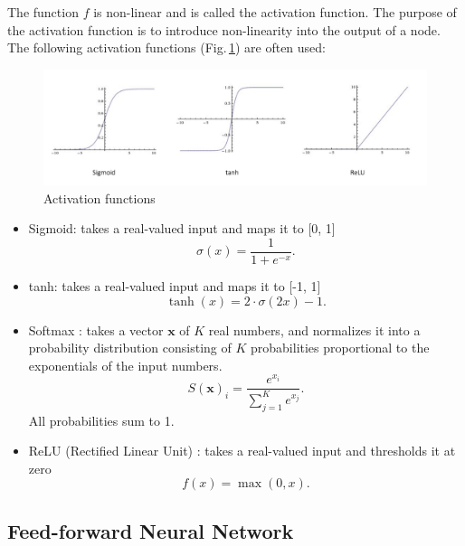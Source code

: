 The function $f$ is non-linear and is called the activation function. The purpose of the activation function is to introduce non-linearity into the output of a node. The following activation functions (Fig.\,\ref{activation}) are often used:
\begin{figure}
	\centering
	\includegraphics[scale=0.5]{Figs/activation.png}
    \caption{Activation functions}
    \label{activation}
\end{figure}

\begin{itemize}
  \item Sigmoid: takes a real-valued input and maps it to [0, 1]
        \begin{equation}
        \label{eq:sigmoid}
        \sigma(x) =  \frac{\mathrm{1} }{\mathrm{1} + e^{-x} }.
        \end{equation}
  \item tanh: takes a real-valued input and maps it to [-1, 1]
  \begin{equation}
        \label{eq:tanh}
        \tanh(x) = 2\cdot\sigma(2x)-1.
        \end{equation}
  \item Softmax \citep{Goodfellow-et-al-2016}:  takes a vector $\mathbf{x}$ of $K$ real numbers, and normalizes it into a probability distribution consisting of $K$ probabilities proportional to the exponentials of the input numbers.
        \begin{equation}
        \label{eq:softmax}
        S(\mathbf{x})_i = \frac{e^{x_i}}{\sum_{j=1}^K e^{x_j}}.
        \end{equation}
        All probabilities sum to 1. 
\item ReLU (Rectified Linear Unit) \citep{Nair:2010:RLU:3104322.3104425}: takes a real-valued input and thresholds it at zero
        \begin{equation}
        \label{eq:relu}
            f(x) = \max(0,x).
        \end{equation}
\end{itemize}

\subsection{Feed-forward Neural Network}

